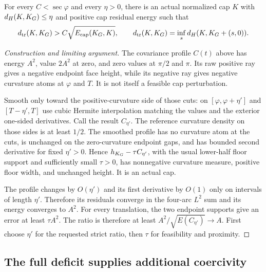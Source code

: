 \begin{theorem}
\label{thm:quant-centered-sharpness}
For every $C<\sec\varphi$ and every $\eta>0$, there is an actual normalized
cap $K$ with $d_H(K,K_G)\le\eta$ and positive cap residual energy such that
\[
 d_{\rm tr}(K,K_G)>C\sqrt{E_{\rm cap}(K_G,K)},
 \qquad d_{\rm tr}(K,K_G)=\inf_s d_H(K,K_G+(s,0)).
\]
\end{theorem}
\begin{proof}[Construction and limiting argument]
The covariance profile $C(t)$ above has energy $A^2$, value $2A^2$ at zero,
and zero values at $\pi/2$ and $\pi$. Its raw positive ray gives a negative
endpoint face height, while its negative ray gives negative curvature atoms
at $\varphi$ and $T$. It is not itself a feasible cap perturbation.

Smooth only toward the positive-curvature side of those cuts: on
$[\varphi,\varphi+\eta']$ and $[T-\eta',T]$ use cubic Hermite interpolation
matching the values and the exterior one-sided derivatives. Call the result
$C_{\eta'}$. The reference curvature density on those sides is at least
$1/2$. The smoothed profile has no curvature atom at the cuts, is unchanged
on the zero-curvature endpoint gaps, and has bounded second derivative for
fixed $\eta'>0$. Hence $h_{K_G}-\tau C_{\eta'}$, with the usual lower-half
floor support and sufficiently small $\tau>0$, has nonnegative curvature
measure, positive floor width, and unchanged height. It is an actual cap.

The profile changes by $O(\eta')$ and its first derivative by $O(1)$ only
on intervals of length $\eta'$. Therefore its residuals converge in the
four-arc $L^2$ sum and its energy converges to $A^2$. For every translation,
the two endpoint supports give an error at least $\tau A^2$. The ratio is
therefore at least $A^2/\sqrt{E(C_{\eta'})}\to A$. First choose $\eta'$
for the requested strict ratio, then $\tau$ for feasibility and proximity.
\end{proof}

\subsection{The full deficit supplies additional coercivity}
\label{sec:quant-full-q}

